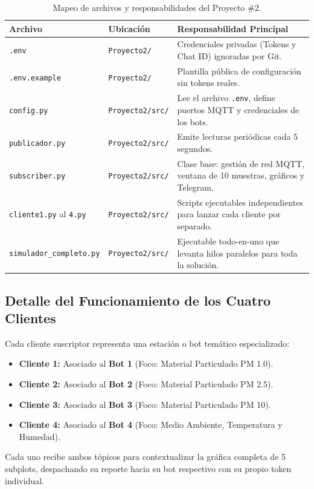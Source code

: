 \documentclass[12pt,letterpaper]{article}
\begin{document}
\begin{table}[H]
\centering
\caption{Mapeo de archivos y responsabilidades del Proyecto \#2.}
\label{tab:modulos}
\begin{tabular}{llp{7.5cm}}
\toprule
\textbf{Archivo} & \textbf{Ubicación} & \textbf{Responsabilidad Principal} \\
\midrule
\texttt{.env} & \texttt{Proyecto2/} & Credenciales privadas (Tokens y Chat ID) ignoradas por Git. \\
\texttt{.env.example} & \texttt{Proyecto2/} & Plantilla pública de configuración sin tokens reales. \\
\texttt{config.py} & \texttt{Proyecto2/src/} & Lee el archivo \texttt{.env}, define puertos MQTT y credenciales de los bots. \\
\texttt{publicador.py} & \texttt{Proyecto2/src/} & Emite lecturas periódicas cada 5 segundos. \\
\texttt{subscriber.py} & \texttt{Proyecto2/src/} & Clase base: gestión de red MQTT, ventana de 10 muestras, gráficos y Telegram. \\
\texttt{cliente1.py} al \texttt{4.py} & \texttt{Proyecto2/src/} & Scripts ejecutables independientes para lanzar cada cliente por separado. \\
\texttt{simulador\_completo.py} & \texttt{Proyecto2/src/} & Ejecutable todo-en-uno que levanta hilos paralelos para toda la solución. \\
\bottomrule
\end{tabular}
\end{table}

\subsection{Detalle del Funcionamiento de los Cuatro Clientes}
Cada cliente suscriptor representa una estación o bot temático especializado:
\begin{itemize}
    \item \textbf{Cliente 1:} Asociado al \textbf{Bot 1} (Foco: Material Particulado PM 1.0).
    \item \textbf{Cliente 2:} Asociado al \textbf{Bot 2} (Foco: Material Particulado PM 2.5).
    \item \textbf{Cliente 3:} Asociado al \textbf{Bot 3} (Foco: Material Particulado PM 10).
    \item \textbf{Cliente 4:} Asociado al \textbf{Bot 4} (Foco: Medio Ambiente, Temperatura y Humedad).
\end{itemize}
Cada uno recibe ambos tópicos para contextualizar la gráfica completa de 5 subplots, despachando su reporte hacia su bot respectivo con su propio token individual.
\end{document}
